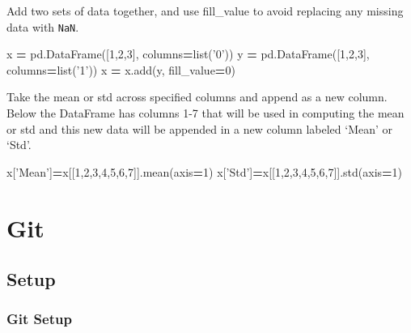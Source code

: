 \documentclass[]{book}
\newenvironment{Shaded}{\begin{snugshade}}{\end{snugshade}}
\newcommand{\DecValTok}[1]{\textcolor[rgb]{0.00,0.00,0.81}{#1}}
\newcommand{\StringTok}[1]{\textcolor[rgb]{0.31,0.60,0.02}{#1}}
\newcommand{\OperatorTok}[1]{\textcolor[rgb]{0.81,0.36,0.00}{\textbf{#1}}}
\newcommand{\BuiltInTok}[1]{#1}
\newcommand{\NormalTok}[1]{#1}
\begin{document}
Add two sets of data together, and use fill\_value to avoid replacing
any missing data with \texttt{NaN}.

\begin{Shaded}
\begin{Highlighting}[]
\NormalTok{x }\OperatorTok{=}\NormalTok{ pd.DataFrame([}\DecValTok{1}\NormalTok{,}\DecValTok{2}\NormalTok{,}\DecValTok{3}\NormalTok{], columns}\OperatorTok{=}\BuiltInTok{list}\NormalTok{(}\StringTok{'0'}\NormalTok{))    }
\NormalTok{y }\OperatorTok{=}\NormalTok{ pd.DataFrame([}\DecValTok{1}\NormalTok{,}\DecValTok{2}\NormalTok{,}\DecValTok{3}\NormalTok{], columns}\OperatorTok{=}\BuiltInTok{list}\NormalTok{(}\StringTok{'1'}\NormalTok{))}
\NormalTok{x }\OperatorTok{=}\NormalTok{ x.add(y, fill_value}\OperatorTok{=}\DecValTok{0}\NormalTok{)}
\end{Highlighting}
\end{Shaded}

Take the mean or std across specified columns and append as a new
column. Below the DataFrame has columns 1-7 that will be used in
computing the mean or std and this new data will be appended in a new
column labeled `Mean' or `Std'.

\begin{Shaded}
\begin{Highlighting}[]
\NormalTok{x[}\StringTok{'Mean'}\NormalTok{]}\OperatorTok{=}\NormalTok{x[[}\DecValTok{1}\NormalTok{,}\DecValTok{2}\NormalTok{,}\DecValTok{3}\NormalTok{,}\DecValTok{4}\NormalTok{,}\DecValTok{5}\NormalTok{,}\DecValTok{6}\NormalTok{,}\DecValTok{7}\NormalTok{]].mean(axis}\OperatorTok{=}\DecValTok{1}\NormalTok{)}
\NormalTok{x[}\StringTok{'Std'}\NormalTok{]}\OperatorTok{=}\NormalTok{x[[}\DecValTok{1}\NormalTok{,}\DecValTok{2}\NormalTok{,}\DecValTok{3}\NormalTok{,}\DecValTok{4}\NormalTok{,}\DecValTok{5}\NormalTok{,}\DecValTok{6}\NormalTok{,}\DecValTok{7}\NormalTok{]].std(axis}\OperatorTok{=}\DecValTok{1}\NormalTok{)}
\end{Highlighting}
\end{Shaded}

\chapter{Git}\label{git}

\section{Setup}\label{setup}

\subsection{Git Setup}\label{git-setup}
\end{document}
